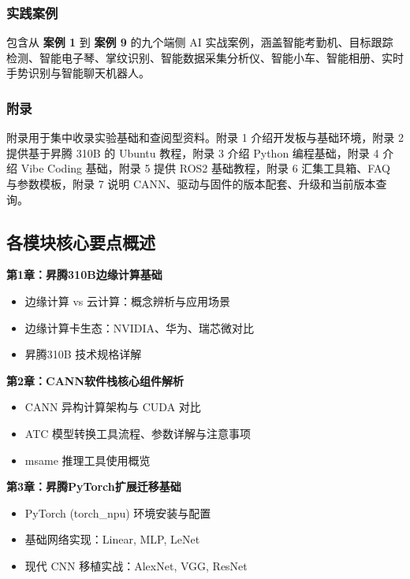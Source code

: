 \subsubsection*{实践案例}\label{src-book-README-h5}

包含从 \textbf{案例 1} 到 \textbf{案例 9} 的九个端侧 AI
实战案例，涵盖智能考勤机、目标跟踪检测、智能电子琴、掌纹识别、智能数据采集分析仪、智能小车、智能相册、实时手势识别与智能聊天机器人。

\subsubsection*{附录}\label{附录}

附录用于集中收录实验基础和查阅型资料。附录 1 介绍开发板与基础环境，附录
2 提供基于昇腾 310B 的 Ubuntu 教程，附录 3 介绍 Python 编程基础，附录 4
介绍 Vibe Coding 基础，附录 5 提供 ROS2 基础教程，附录 6 汇集工具箱、FAQ
与参数模板，附录 7 说明 CANN、驱动与固件的版本配套、升级和当前版本查询。

\subsection*{各模块核心要点概述}\label{src-book-README-h6}

\textbf{第1章：昇腾310B边缘计算基础}

\begin{itemize}
\tightlist
\item
  边缘计算 vs 云计算：概念辨析与应用场景
\item
  边缘计算卡生态：NVIDIA、华为、瑞芯微对比
\item
  昇腾310B 技术规格详解
\end{itemize}

\textbf{第2章：CANN软件栈核心组件解析}

\begin{itemize}
\tightlist
\item
  CANN 异构计算架构与 CUDA 对比
\item
  ATC 模型转换工具流程、参数详解与注意事项
\item
  msame 推理工具使用概览
\end{itemize}

\textbf{第3章：昇腾PyTorch扩展迁移基础}

\begin{itemize}
\tightlist
\item
  PyTorch (torch\_npu) 环境安装与配置
\item
  基础网络实现：Linear, MLP, LeNet
\item
  现代 CNN 移植实战：AlexNet, VGG, ResNet
\end{itemize}

